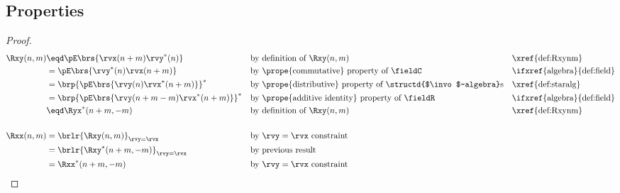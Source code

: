 \subsection{Properties}
\begin{theorem}
\label{thm:Rxxnm}
\label{thm:Ryynm}
\label{thm:Rxynm}
\end{theorem}
\begin{proof}
\begin{align*}
  \Rxy(n,m)
     &\eqd \pE\brs{\rvx(n+m) \rvy^\ast(n)}
     && \text{by definition of $\Rxy(n,m)$}
     && \text{\xref{def:Rxynm}}
   \\&= \pE\brs{\rvy^\ast(n) \rvx(n+m)}
     && \text{by \prope{commutative} property of $\fieldC$}
     && \text{\ifxref{algebra}{def:field}}
   \\&= \brp{\pE\brs{\rvy(n) \rvx^\ast(n+m)}}^\ast
     && \text{by \prope{distributive} property of \structd{$\invo$-algebra}s}
     && \text{\xref{def:staralg}}
   \\&= \brp{\pE\brs{\rvy(n+m-m) \rvx^\ast(n+m)}}^\ast
     && \text{by \prope{additive identity} property of $\fieldR$}
     && \text{\ifxref{algebra}{def:field}}
   \\&\eqd \Ryx^\ast(n+m,-m)
     && \text{by definition of $\Rxy(n,m)$}
     && \text{\xref{def:Rxynm}}
   \\
   \\
   \Rxx(n,m)
     &= \brlr{\Rxy(n,m)}_{\rvy=\rvx}
     && \text{by $\rvy=\rvx$ constraint}
   \\&= \brlr{\Rxy^\ast(n+m,-m)}_{\rvy=\rvx}
     && \text{by previous result}
   \\&= \Rxx^\ast(n+m,-m)
     && \text{by $\rvy=\rvx$ constraint}
\end{align*}
\end{proof}

